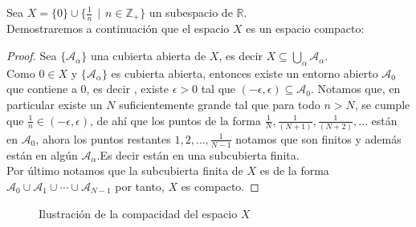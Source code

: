 \begin{example}
    Sea $X = \{0\} \cup \{ \frac{1}{n} \hspace{5pt} | \hspace{5pt} n \in \mathbb{Z}_{+} \}$ un subespacio de $\mathbb{R}$.
    \\Demostraremos a continuación que el espacio $X$ es un espacio compacto:
    \begin{proof}
        Sea $\{\mathcal{A}_{\alpha}\}$ una cubierta abierta de $X$, es decir $X \subseteq \displaystyle \bigcup_{\alpha} \mathcal{A}_{\alpha}$.
        \\Como $0 \in X$ y $\{\mathcal{A}_{\alpha}\}$ es cubierta abierta, entonces existe un entorno abierto $\mathcal{A}_0$ que contiene a 0, es decir , existe $\epsilon > 0$ tal que $(-\epsilon, \epsilon) \subseteq \mathcal{A}_0$.
        Notamos que, en particular existe un $N$ suficientemente grande tal que para todo $n>N$, se cumple que $\frac{1}{n} \in (-\epsilon,\epsilon)$, de ahí que los puntos de la forma $\frac{1}{N},\frac{1}{(N+1)},\frac{1}{(N+2)}, \dotsc $ están en $\mathcal{A}_0$, ahora los puntos restantes $1,2,\dotsc ,\frac{1}{N-1}$ notamos que son finitos y además están en algún $\mathcal{A}_{\alpha}$.Es decir están en una subcubierta finita.
        \\Por último notamos que la subcubierta finita de $X$ es de la forma $\mathcal{A}_0 \cup \mathcal{A}_{1} \cup \cdots \cup \mathcal{A}_{N-1}$ por tanto, $X$ es compacto.

    \end{proof}

\end{example}
\begin{figure}[H]
    \centering
    \begin{center}
    \end{center}
    \label{fig:compacto}
    \caption{Ilustración de la compacidad del espacio $X$}

\end{figure}
